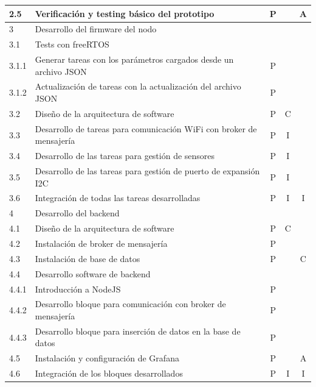 \documentclass[11pt]{charter}
\begin{document}
\begin{table}[htpb]
{\begin{tabular}{|l|l|c|c|c|}
2.5      & Verificación y testing básico del prototipo                           & P &   & A \\ \hline
3        & \multicolumn{4}{l|}{Desarrollo del firmware del nodo}                             \\ \hline
3.1      & \multicolumn{4}{l|}{Tests con freeRTOS}                                           \\ \hline
3.1.1	 & Generar tareas con los parámetros cargados desde un archivo JSON      & P &   &   \\ \hline
3.1.2	 & Actualización de tareas con la actualización del archivo JSON         & P &   &   \\ \hline
3.2      & Diseño de la arquitectura de software                                 & P & C &   \\ \hline
3.3      & Desarrollo de tareas para comunicación WiFi con broker de mensajería & P & I &   \\ \hline
3.4      & Desarrollo de las tareas para gestión de sensores                     & P & I &   \\ \hline
3.5      & Desarrollo de las tareas para gestión de puerto de expansión I2C      & P & I &   \\ \hline
3.6      & Integración de todas las tareas desarrolladas                         & P & I & I \\ \hline
4        & \multicolumn{4}{l|}{Desarrollo del backend}                                       \\ \hline
4.1      & Diseño de la arquitectura de software                                 & P & C &   \\ \hline
4.2      & Instalación de broker de mensajería                                  & P &   &   \\ \hline
4.3      & Instalación de base de datos                                          & P &   & C \\ \hline
4.4      & \multicolumn{4}{l|}{Desarrollo software de backend}                               \\ \hline
4.4.1    & Introducción a NodeJS                                                 & P &   &   \\ \hline
4.4.2    & Desarrollo bloque para comunicación con broker de mensajería         & P &   &   \\ \hline
4.4.3    & Desarrollo bloque para inserción de datos en la base de datos         & P &   &   \\ \hline
4.5      & Instalación y configuración de Grafana                                & P &   & A \\ \hline
4.6      & Integración de los bloques desarrollados                              & P & I & I \\ \hline
\end{tabular}%
}
\end{table}
\end{document}
